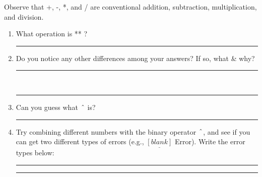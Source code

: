 \documentclass[paper=a4, fontsize=11pt]{scrartcl} %
\numberwithin{equation}{section} %
\numberwithin{figure}{section} %
\numberwithin{table}{section} %
\begin{document}
\vspace{1cm}

Observe that +, -, *, and / are conventional addition, subtraction, multiplication, and division.

\begin{enumerate}

\item What operation is ** ?\\ 

\rule{13cm}{0.15mm}




\item Do you notice any other differences among your answers?  If so, what \& why?\\ 

\rule{13cm}{0.15mm}\\

\rule{13cm}{0.15mm}

\item Can you guess what $\hspace{1mm} \hat{ } \hspace{1mm}$ is?\\ 

\rule{13cm}{0.15mm}

\item Try combining different numbers with the binary operator  $\hspace{1mm} \hat{ } \hspace{1mm}$, and see if you can get two different types of errors (e.g., $\underline{[blank]}$ Error).   Write the error types below:\\

\rule{5cm}{0.15mm} \hspace{3cm} \rule{5cm}{0.15mm}\\



\end{enumerate}
\end{document}
